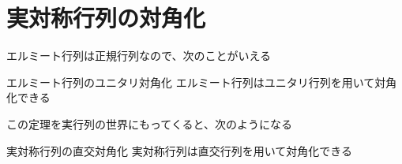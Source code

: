 \documentclass[../../../topic_linear-algebra]{subfiles}
\begin{document}
\sectionline
\section{実対称行列の対角化}

エルミート行列は正規行列なので、次のことがいえる

\begin{theorem}{エルミート行列のユニタリ対角化}
  エルミート行列はユニタリ行列を用いて対角化できる
\end{theorem}

この定理を実行列の世界にもってくると、次のようになる

\begin{theorem}{実対称行列の直交対角化}
  実対称行列は直交行列を用いて対角化できる
\end{theorem}
\end{document}
